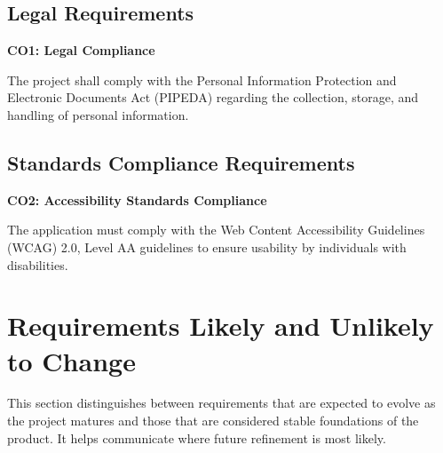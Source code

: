 \documentclass[11pt]{article}
\begin{document}
\subsection{Legal Requirements}\label{subsec:legal}

\textbf{CO1: Legal Compliance}\label{req:CO1}

The project shall comply with the Personal Information Protection and Electronic Documents Act (PIPEDA) regarding the collection, storage, and handling of personal information.

\subsection{Standards Compliance Requirements}\label{subsec:standards}

\textbf{CO2: Accessibility Standards Compliance}\label{req:CO2}

The application must comply with the Web Content Accessibility Guidelines (WCAG) 2.0, Level AA guidelines to ensure usability by individuals with disabilities.

\section{Requirements Likely and Unlikely to Change}
This section distinguishes between requirements that are expected to evolve as the project matures and those that are considered stable foundations of the product. It helps communicate where future refinement is most likely.
\end{document}
